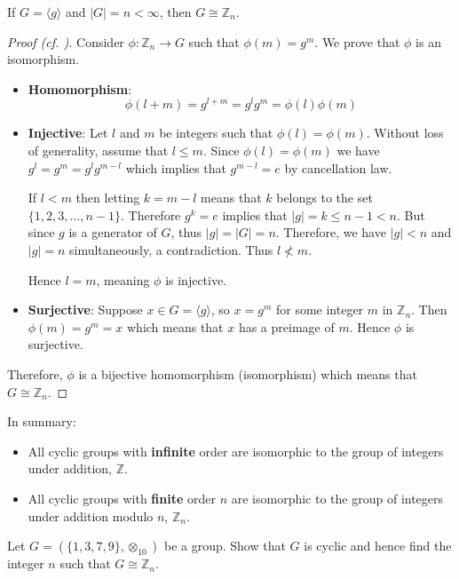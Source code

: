 \begin{theorem}\label{thrm-finite-cyclic-group-isomorphic-to-Zn}
    If $G = \langle g\rangle$ and $|G| = n < \infty$, then $G \cong \mathbb{Z}_n$.
\end{theorem}
\begin{proof}[Proof (cf. {\cite[\S 63]{clark_1984}})]
    Consider $\phi: \mathbb{Z}_n \to G$ such that $\phi(m) = g^m$. We prove that $\phi$ is an isomorphism.
    \begin{itemize}
        \item \textbf{Homomorphism}:
        \[
            \phi(l+m) = g^{l+m} = g^lg^m = \phi(l)\phi(m)
        \]

        \item \textbf{Injective}: Let $l$ and $m$ be integers such that $\phi(l) = \phi(m)$. Without loss of generality, assume that $l \leq m$. Since $\phi(l) = \phi(m)$ we have $g^l = g^m = g^lg^{m-l}$ which implies that $g^{m-l} = e$ by cancellation law.

        If $l < m$ then letting $k = m - l$ means that $k$ belongs to the set $\{1, 2, 3, \dots, n-1\}$. Therefore $g^k = e$ implies that $|g| = k \leq n - 1 < n$. But since $g$ is a generator of $G$, thus $|g| = |G| = n$. Therefore, we have $|g| < n$ and $|g| = n$ simultaneously, a contradiction. Thus $l \not< m$.

        Hence $l = m$, meaning $\phi$ is injective.
        \item \textbf{Surjective}: Suppose $x \in G = \langle g\rangle$, so $x = g^m$ for some integer $m$ in $\mathbb{Z}_n$. Then $\phi(m) = g^m = x$ which means that $x$ has a preimage of $m$. Hence $\phi$ is surjective.
    \end{itemize}

    Therefore, $\phi$ is a bijective homomorphism (isomorphism) which means that $G \cong \mathbb{Z}_n$.
\end{proof}

In summary:
\begin{itemize}
    \item All cyclic groups with \textbf{infinite} order are isomorphic to the group of integers under addition, $\mathbb{Z}$.
    \item All cyclic groups with \textbf{finite} order $n$ are isomorphic to the group of integers under addition modulo $n$, $\mathbb{Z}_n$.
\end{itemize}

\begin{exercise}
    Let $G = (\{1, 3, 7, 9\}, \otimes_{10})$ be a group. Show that $G$ is cyclic and hence find the integer $n$ such that $G \cong \mathbb{Z}_n$.
\end{exercise}

